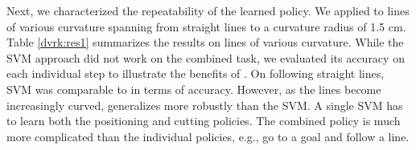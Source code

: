 Next, we characterized the repeatability of the learned policy.
We applied \hirl to lines of various curvature spanning from straight lines to a curvature radius of 1.5 cm.
Table \ref{dvrk:res1} summarizes the results on lines of various curvature.
While the SVM approach did not work on the combined task, we evaluated its accuracy on each individual step to illustrate the benefits of \hirl.
On following straight lines, SVM was comparable to \hirl in terms of accuracy.
However, as the lines become increasingly curved, \hirl generalizes more robustly than the SVM.
A single SVM has to learn both the positioning and cutting policies. The combined policy is much more complicated than the individual policies, e.g., go to a  goal and follow a line.



